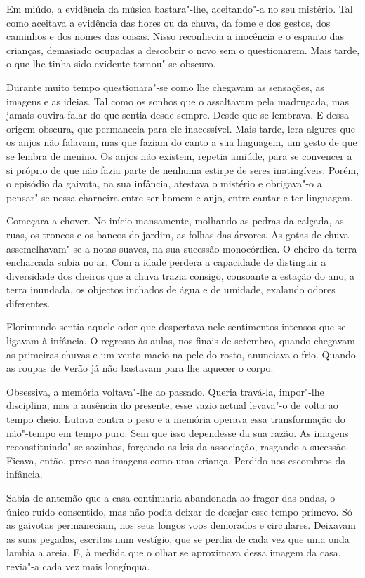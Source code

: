Em miúdo, a evidência da música bastara"-lhe, aceitando"-a no seu
mistério. Tal como aceitava a evidência das flores ou da chuva, da fome
e dos gestos, dos caminhos e dos nomes das coisas. Nisso reconhecia a
inocência e o espanto das crianças, demasiado ocupadas a descobrir o
novo sem o questionarem. Mais tarde, o que lhe tinha sido evidente
tornou"-se obscuro.

Durante muito tempo questionara"-se como lhe chegavam as sensações, as
imagens e as ideias. Tal como os sonhos que o assaltavam pela madrugada,
mas jamais ouvira falar do que sentia desde sempre. Desde que se
lembrava. E dessa origem obscura, que permanecia para ele inacessível.
Mais tarde, lera algures que os anjos não falavam, mas que faziam do
canto a sua linguagem, um gesto de que se lembra de menino. Os anjos não
existem, repetia amiúde, para se convencer a si próprio de que não fazia
parte de nenhuma estirpe de seres inatingíveis. Porém, o episódio da
gaivota, na sua infância, atestava o mistério e obrigava"-o a pensar"-se
nessa charneira entre ser homem e anjo, entre cantar e ter linguagem.

Começara a chover. No início mansamente, molhando as pedras da calçada,
as ruas, os troncos e os bancos do jardim, as folhas das árvores. As
gotas de chuva assemelhavam"-se a notas suaves, na sua sucessão
monocórdica. O cheiro da terra encharcada subia no ar. Com a idade
perdera a capacidade de distinguir a diversidade dos cheiros que a chuva
trazia consigo, consoante a estação do ano, a terra inundada, os
objectos inchados de água e de umidade, exalando odores diferentes.

Florimundo sentia aquele odor que despertava nele sentimentos intensos
que se ligavam à infância. O regresso às aulas, nos finais de setembro,
quando chegavam as primeiras chuvas e um vento macio na pele do rosto,
anunciava o frio. Quando as roupas de Verão já não bastavam para lhe
aquecer o corpo.

Obsessiva, a memória voltava"-lhe ao passado. Queria travá-la, impor"-lhe
disciplina, mas a ausência do presente, esse vazio actual levava"-o de
volta ao tempo cheio. Lutava contra o peso e a memória operava essa
transformação do não"-tempo em tempo puro. Sem que isso dependesse da sua
razão. As imagens reconstituindo"-se sozinhas, forçando as leis da
associação, rasgando a sucessão. Ficava, então, preso nas imagens como
uma criança. Perdido nos escombros da infância.

Sabia de antemão que a casa continuaria abandonada ao fragor das ondas,
o único ruído consentido, mas não podia deixar de desejar esse tempo
primevo. Só as gaivotas permaneciam, nos seus longos voos demorados e
circulares. Deixavam as suas pegadas, escritas num vestígio, que se
perdia de cada vez que uma onda lambia a areia. E, à medida que o olhar
se aproximava dessa imagem da casa, revia"-a cada vez mais longínqua.

